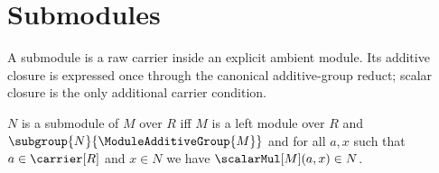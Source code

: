


\section{Submodules}

A submodule is a raw carrier inside an explicit ambient module.  Its additive
closure is expressed once through the canonical additive-group reduct; scalar
closure is the only additional carrier condition.

\begin{definition}\label{submodule}
    $N$ is a submodule of $M$ over $R$ iff
        $M$ is a left module over $R$ and
        $\subgroup{N}{\ModuleAdditiveGroup{M}}$ and
        for all $a,x$ such that
            $a\in\carrier[R]$ and $x\in N$ we have
            $\scalarMul[M](a,x)\in N$.
\end{definition}

